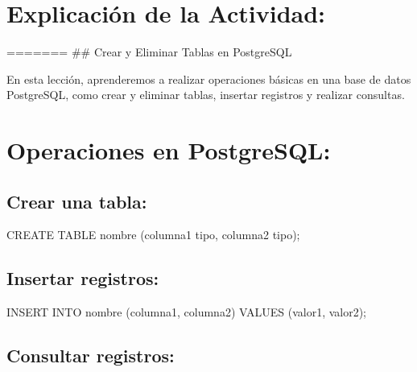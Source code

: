 \documentclass[
  a4paper,
  DIV=11,
  numbers=noendperiod,
  onepage,
  openany]{scrreprt}
\newenvironment{Shaded}{\begin{snugshade}}{\end{snugshade}}
\newcommand{\KeywordTok}[1]{\textcolor[rgb]{0.00,0.23,0.31}{#1}}
\newcommand{\NormalTok}[1]{\textcolor[rgb]{0.00,0.23,0.31}{#1}}
\begin{document}
\hypertarget{explicaciuxf3n-de-la-actividad-74}{%
\section{Explicación de la
Actividad:}\label{explicaciuxf3n-de-la-actividad-74}}

======= \#\# Crear y Eliminar Tablas en PostgreSQL

En esta lección, aprenderemos a realizar operaciones básicas en una base
de datos PostgreSQL, como crear y eliminar tablas, insertar registros y
realizar consultas.

\hypertarget{operaciones-en-postgresql-1}{%
\section{Operaciones en PostgreSQL:}\label{operaciones-en-postgresql-1}}

\hypertarget{crear-una-tabla-5}{%
\subsection{Crear una tabla:}\label{crear-una-tabla-5}}

\begin{Shaded}
\begin{Highlighting}[]
\KeywordTok{CREATE} \KeywordTok{TABLE}\NormalTok{ nombre (columna1 tipo, columna2 tipo);}
\end{Highlighting}
\end{Shaded}

\hypertarget{insertar-registros-5}{%
\subsection{Insertar registros:}\label{insertar-registros-5}}

\begin{Shaded}
\begin{Highlighting}[]
\KeywordTok{INSERT} \KeywordTok{INTO}\NormalTok{ nombre (columna1, columna2) }\KeywordTok{VALUES}\NormalTok{ (valor1, valor2);}
\end{Highlighting}
\end{Shaded}

\hypertarget{consultar-registros-5}{%
\subsection{Consultar registros:}\label{consultar-registros-5}}
\end{document}
